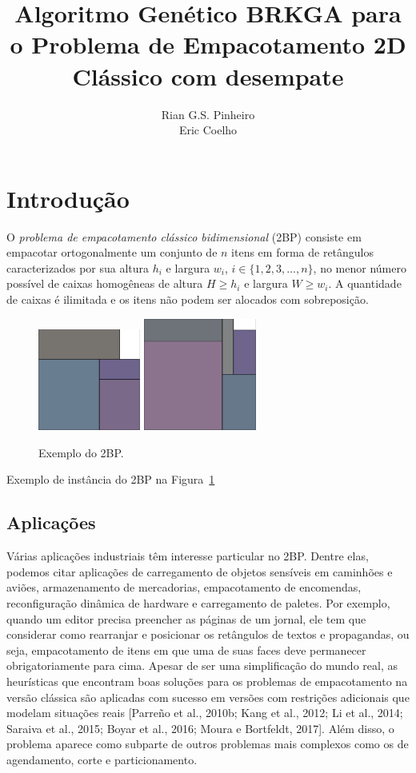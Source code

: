 \documentclass[article]{rian_article}
\author{Rian G.S. Pinheiro\\ \email{rian@ic.ufal.br}\And 
        Eric Coelho\\ \email{esc2@ic.ufal.br}}%
\title{Algoritmo Genético BRKGA para o Problema de Empacotamento 2D 	Clássico com desempate}
\begin{document}
\section{Introdução}

O \textit{problema de empacotamento clássico bidimensional} (2BP) consiste em empacotar ortogonalmente um conjunto de $n$ itens em forma de retângulos caracterizados por sua altura $h_{i}$ e largura $w_{i}$, $i \in \{1, 2, 3, ... , n\}$, no menor número possível de caixas homogêneas de altura $H \geq h_{i}$ e largura $W \geq w_{i}$. A quantidade de caixas é ilimitada e os itens não podem ser alocados com sobreposição.

\begin{figure}[hbt]
\centering
\includegraphics[width=0.3\textwidth]{figs/ex_instance_1.png}\hspace{0.1\textwidth}
\includegraphics[width=0.33\textwidth]{figs/ex_instance_2.png}
\caption{Exemplo do 2BP.} \label{fig:ex}
\end{figure}
 
Exemplo de instância do 2BP na Figura~\ref{fig:ex}

\subsection{Aplicações}
Várias aplicações industriais têm interesse particular no 2BP. Dentre elas, podemos citar aplicações de carregamento de objetos sensíveis em caminhões e aviões, armazenamento de mercadorias, empacotamento de encomendas, reconfiguração dinâmica de hardware e carregamento de paletes. Por exemplo, quando um editor precisa preencher as páginas de um jornal, ele tem que considerar como rearranjar e posicionar os retângulos de textos e propagandas, ou seja, empacotamento de itens em que uma de suas faces deve permanecer obrigatoriamente para cima. Apesar de ser uma simplificação do mundo real, as heurísticas que encontram boas soluções para os problemas de empacotamento na versão clássica são aplicadas com sucesso em versões com restrições adicionais que modelam situações reais [Parreño et al., 2010b; Kang et al., 2012; Li et al., 2014; Saraiva et al., 2015; Boyar et al., 2016; Moura e Bortfeldt, 2017]. Além disso, o problema aparece como subparte de outros problemas mais complexos como os de agendamento, corte e particionamento.
\end{document}
